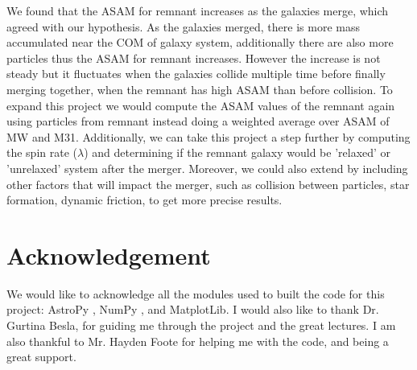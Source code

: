 \documentclass[twocolumn]{aastex631}
\begin{document}
We found that the ASAM for remnant increases as the galaxies merge, which agreed with our hypothesis. As the galaxies merged, there is more mass accumulated near the COM of galaxy system, additionally there are also more particles thus the ASAM for remnant increases. However the increase is not steady but it fluctuates when the galaxies collide multiple time before finally merging together, when the remnant has high ASAM than before collision.
To expand this project we would compute the ASAM values of the remnant again using particles from remnant instead doing a weighted average over ASAM of MW and M31. Additionally, we can take this project a step further by computing the spin rate ($\lambda$) and determining if the remnant galaxy would be 'relaxed' or 'unrelaxed' system after the merger. Moreover, we could also extend by including other factors that will impact the merger, such as collision between particles, star formation, dynamic friction, to get more precise results.

\section{Acknowledgement} \label{sec:acknowledge}
We would like to acknowledge all the modules used to built the code for this project: AstroPy \citep{astropy},  NumPy \citep{numpy}, and MatplotLib\citep{matplot}. I would also like to thank Dr. Gurtina Besla, for guiding me through the project and the great lectures. I am also thankful to Mr. Hayden Foote for helping me with the code, and being a great support.



\end{document}
